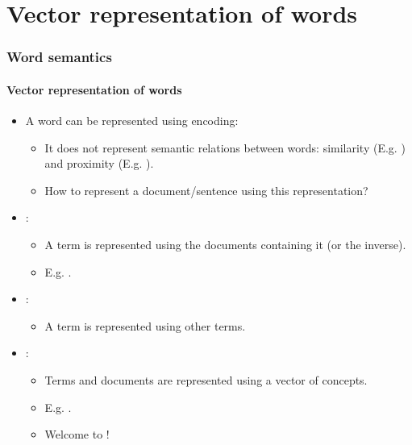 \documentclass[xcolor=table]{beamer}
\begin{document}
\section{Vector representation of words}

\begin{frame}
\frametitle{Word semantics}
\framesubtitle{Vector representation of words}

\begin{itemize}
	\item A word can be represented using  encoding:
	\begin{itemize}
		\item It does not represent semantic relations between words: similarity (E.g. ) and proximity (E.g. ).
		\item How to represent a document/sentence using this representation?
	\end{itemize}

	\item {}:
	\begin{itemize}
		\item A term is represented using the documents containing it (or the inverse).
		\item E.g. .
	\end{itemize}

	\item {}:
	\begin{itemize}
		\item A term is represented using other terms.
	\end{itemize}

	\item {}:
	\begin{itemize}
		\item Terms and documents are represented using a vector of concepts.
		\item E.g. .
		\item Welcome to !
	\end{itemize}

\end{itemize}

\end{frame}
\end{document}
